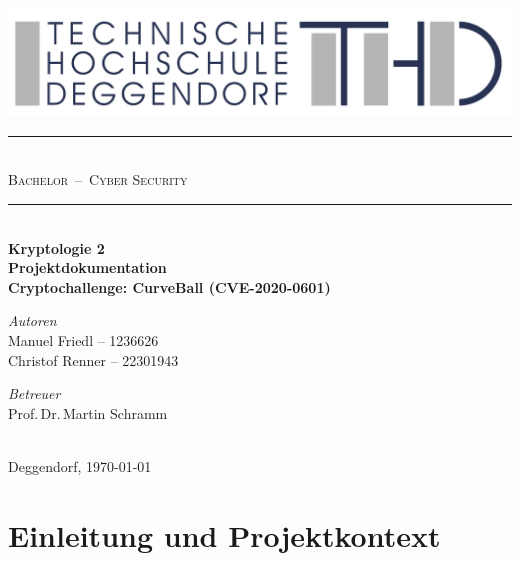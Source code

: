 \documentclass{article}
\begin{document}
\begin{titlepage}
  \begin{center}
    \includegraphics[width=\textwidth]{THD-Logo.pdf}
    \vspace{1cm}
    \rule{\textwidth}{1mm}\\[0.3cm]
    \textsc{\scshape \huge Bachelor \,--\, Cyber Security}\\
    \rule{\textwidth}{1mm}\\[1.8cm]

    {\Large \bfseries Kryptologie 2}\\[1cm]
    {\Huge \bfseries Projektdokumentation}\\[0.5cm]
    {\Large \bfseries Cryptochallenge: CurveBall (CVE-2020-0601)}\\[2cm]

    \begin{minipage}[t]{0.45\textwidth}
      \begin{flushleft}
        \normalsize \emph{Autoren}\\
        Manuel Friedl – 1236626\\
        Christof Renner – 22301943
      \end{flushleft}
    \end{minipage}
    \hfill
    \begin{minipage}[t]{0.45\textwidth}
      \begin{flushright}
        \normalsize \emph{Betreuer}\\
        Prof.\,Dr.\,Martin Schramm
      \end{flushright}
    \end{minipage}\\[2cm]

    {\large Deggendorf, \today}
  \end{center}
\end{titlepage}

\newpage
{}
\tableofcontents
\newpage
{}

\section{Einleitung und Projektkontext}
\end{document}
